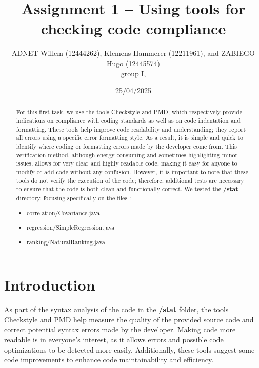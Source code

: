 \documentclass[twocolumn,10pt]{article}
\begin{document}
\title{Assignment 1 -- Using tools for checking code compliance}
\author{ADNET Willem (12444262), Klemens Hammerer (12211961), and ZABIEGO Hugo (12445574) \\
group I, 
}

\date{25/04/2025}




\maketitle

\begin{abstract}
For this first task, we use the tools Checkstyle and PMD, which respectively provide indications on compliance with coding standards as well as on code indentation and formatting. These tools help improve code readability and understanding; they report all errors using a specific error formatting style. As a result, it is simple and quick to identify where coding or formatting errors made by the developer come from.
This verification method, although energy-consuming and sometimes highlighting minor issues, allows for very clear and highly readable code, making it easy for anyone to modify or add code without any confusion.
However, it is important to note that these tools do not verify the execution of the code; therefore, additional tests are necessary to ensure that the code is both clean and functionally correct.
We tested the \textbf{/stat} directory, focusing specifically on the files : 
\begin{itemize}[itemsep=0pt, topsep=0pt, parsep=0pt, partopsep=0pt]
    \item correlation/Covariance.java
    \item regression/SimpleRegression.java
    \item ranking/NaturalRanking.java
\end{itemize}

\end{abstract}

\section{Introduction}

As part of the syntax analysis of the code in the \textbf{/stat} folder, the tools Checkstyle and PMD help measure the quality of the provided source code and correct potential syntax errors made by the developer. Making code more readable is in everyone's interest, as it allows errors and possible code optimizations to be detected more easily. Additionally, these tools suggest some code improvements to enhance code maintainability and efficiency. 
\end{document}

